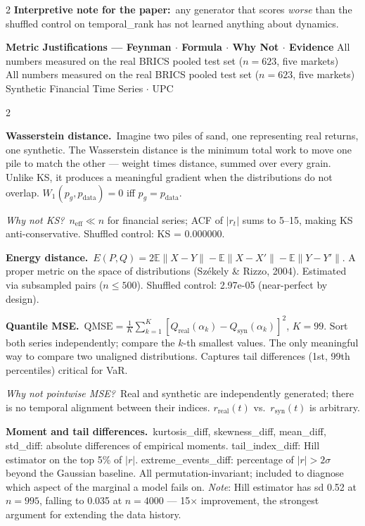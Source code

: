 \documentclass[10pt]{article}
\newcommand{\tealbox}[2]{\begin{tcolorbox}[mybox={Teal}{LBg},title={#1}]#2\end{tcolorbox}}
\newcommand{\pagehead}[2]{%
  \begin{tcolorbox}[enhanced,arc=0pt,outer arc=0pt,boxrule=0pt,
    colback=Navy,colframe=Navy,
    top=5pt,bottom=5pt,left=8pt,right=8pt,
    before skip=0pt,after skip=10pt]
  {\color{white}\large\bfseries #1}%
  \ifx\relax#2\relax\else\\[1pt]{\color{blue!30!white}\small #2}\fi
  \hfill{\color{blue!20!white}\footnotesize Synthetic Financial Time Series $\cdot$ UPC}
  \end{tcolorbox}}
\newcommand{\E}{\mathbb{E}}
\begin{document}
\begin{multicols}{2}
{\smallskip
\textbf{Interpretive note for the paper:}\ any generator that scores \emph{worse} than the shuffled control on temporal\_rank has not learned anything about dynamics.}

\end{multicols}

\clearpage

\pagehead{Metric Justifications --- Feynman $\cdot$ Formula $\cdot$ Why Not $\cdot$ Evidence}
         {All numbers measured on the real BRICS pooled test set ($n=623$, five markets)}

\begin{multicols}{2}

\tealbox{\textbf{Fidelity Group} (permutation-invariant, 9 metrics)}{%
\textbf{Wasserstein distance.}\ Imagine two piles of sand, one representing real returns, one synthetic. The Wasserstein distance is the minimum total work to move one pile to match the other --- weight times distance, summed over every grain. Unlike KS, it produces a meaningful gradient when the distributions do not overlap. $W_1(p_g, p_\text{data}) = 0$ iff $p_g = p_\text{data}$.

\smallskip
\textit{Why not KS?}\ $n_\text{eff} \ll n$ for financial series; ACF of $|r_t|$ sums to 5--15, making KS anti-conservative. Shuffled control: KS = 0.000000.

\smallskip
\textbf{Energy distance.}\ $E(P,Q) = 2\E\|X-Y\| - \E\|X-X'\| - \E\|Y-Y'\|$. A proper metric on the space of distributions (Sz\'{e}kely \& Rizzo, 2004). Estimated via subsampled pairs ($n\leq500$). Shuffled control: 2.97e-05 (near-perfect by design).

\smallskip
\textbf{Quantile MSE.}\ $\text{QMSE} = \frac{1}{K}\sum_{k=1}^K [Q_\text{real}(\alpha_k) - Q_\text{syn}(\alpha_k)]^2$, $K=99$. Sort both series independently; compare the $k$-th smallest values. The only meaningful way to compare two unaligned distributions. Captures tail differences (1st, 99th percentiles) critical for VaR.

\smallskip
\textit{Why not pointwise MSE?}\ Real and synthetic are independently generated; there is no temporal alignment between their indices. $r_\text{real}(t)$ vs.\ $r_\text{syn}(t)$ is arbitrary.

\smallskip
\textbf{Moment and tail differences.}\ kurtosis\_diff, skewness\_diff, mean\_diff, std\_diff: absolute differences of empirical moments. tail\_index\_diff: Hill estimator on the top 5\% of $|r|$. extreme\_events\_diff: percentage of $|r|>2\sigma$ beyond the Gaussian baseline. All permutation-invariant; included to diagnose which aspect of the marginal a model fails on. \textit{Note}: Hill estimator has sd 0.52 at $n=995$, falling to 0.035 at $n=4000$ --- 15$\times$ improvement, the strongest argument for extending the data history.}


\end{multicols}
\end{document}
